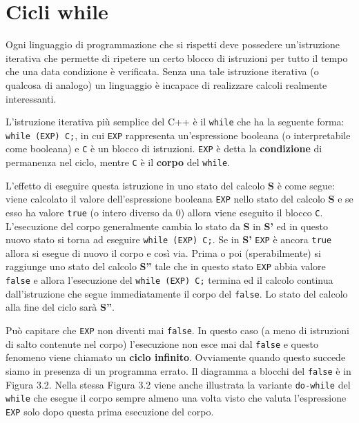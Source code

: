\documentclass[a4paper,12pt]{book}
\begin{document}
\section{Cicli while}
Ogni linguaggio di programmazione che si rispetti deve possedere un'istruzione iterativa che permette di ripetere un certo blocco di istruzioni per tutto il tempo che una data condizione è verificata.
Senza una tale istruzione iterativa (o qualcosa di analogo) un linguaggio è incapace di realizzare calcoli realmente interessanti.

L'istruzione iterativa più semplice del C++ è il \texttt{while} che ha la seguente forma: \texttt{while (EXP) C;}, in cui \texttt{EXP} rappresenta un'espressione booleana (o interpretabile come booleana) e \texttt{C} è un blocco di istruzioni.
\texttt{EXP} è detta la \textbf{condizione} di permanenza nel ciclo, mentre \texttt{C} è il \textbf{corpo} del \texttt{while}.

L'effetto di eseguire questa istruzione in uno stato del calcolo \textbf{S} è come segue: viene calcolato il valore dell'espressione booleana \texttt{EXP} nello stato del calcolo \textbf{S} e se esso ha valore \texttt{true} (o intero diverso da 0) allora viene eseguito il blocco \texttt{C}.
L'esecuzione del corpo generalmente cambia lo stato da \textbf{S} in \textbf{S'} ed in questo nuovo stato si torna ad eseguire \texttt{while (EXP) C;}.
Se in \textbf{S'} \texttt{EXP} è ancora \texttt{true} allora si esegue di nuovo il corpo e così via.
Prima o poi (sperabilmente) si raggiunge uno stato del calcolo \textbf{S''} tale che in questo stato \texttt{EXP} abbia valore \texttt{false} e allora l'esecuzione del \texttt{while (EXP) C;} termina ed il calcolo continua dall'istruzione che segue immediatamente il corpo del \texttt{false}.
Lo stato del calcolo alla fine del ciclo sarà \textbf{S''}.


Può capitare che \texttt{EXP} non diventi mai \texttt{false}.
In questo caso (a meno di istruzioni di salto contenute nel corpo) l'esecuzione non esce mai dal \texttt{false} e questo fenomeno viene chiamato un \textbf{ciclo infinito}.
Ovviamente quando questo succede siamo in presenza di un programma errato.
Il diagramma a blocchi del \texttt{false} è in Figura 3.2. Nella stessa Figura 3.2 viene anche illustrata la variante \texttt{do-while} del \texttt{while} che esegue il corpo sempre almeno una volta visto che valuta l'espressione \texttt{EXP} solo dopo questa prima esecuzione del corpo. 
\end{document}

